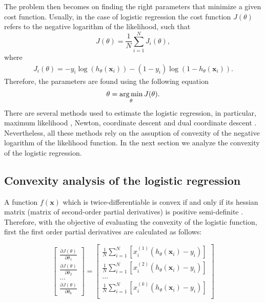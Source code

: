 The problem then becomes on finding the right parameters that minimize a given cost function.   
Usually, in the case of logistic regression the cost function $J(\theta)$ refers to the negative   
logarithm of the likelihood, such that
\begin{equation}
  J(\theta)=\frac{1}{N}\sum_{i=1}^{N} J_i(\theta),
\end{equation}
where
\begin{align}
  J_i(\theta) =  -y_i\log(h_\theta(\mathbf{x}_i)) -(1-y_i)\log(1-h_\theta(\mathbf{x}_i)).
\end{align}
Therefore, the parameters are found using the following equation
\begin{align}
  \theta = \operatorname*{arg\,min}_\theta J(\theta).
\end{align}
There are several methods used to estimate the logistic regression, in particular, maximum 
likelihood \citep{Hastie2009}, Newton, coordinate descent \citep{Murphy2012} and dual coordinate 
descent \citep{Yu2011}. Nevertheless, all these methods rely on the assuption of convexity of the
negative logarithm of the likelihood function. In the next section we analyze the convexity of the 
logistic regression.

\subsection{Convexity analysis of the logistic regression}

A function $f(\mathbf{x})$ which is twice-differentiable is convex if and only if its hessian 
matrix (matrix of second-order partial derivatives) is positive semi-definite \citep{Boyd2010}.
Therefore, with the objective of evaluating the convexity of the logistic function, first the first 
order partial derivatives are calculated as follows:

\begin{equation}
\left[ \begin{array}{c}
  \frac{\partial J(\theta)}{\partial \theta_1} \\[0.1in]	
  \frac{\partial J(\theta)}{\partial \theta_2} \\[0.1in]	
  \ldots \\[0.1in]	
  \frac{\partial J(\theta)}{\partial \theta_k}
\end{array} \right] =
\left[ \begin{array}{c}
  \frac{1}{N}\sum_{i=1}^{N}\left[x_i^{(1)}\left(h_\theta(\mathbf{x}_i)-y_i\right)\right]\\[0.1in]
  \frac{1}{N}\sum_{i=1}^{N}\left[x_i^{(2)}\left(h_\theta(\mathbf{x}_i)-y_i\right)\right]\\[0.1in]
  \ldots \\[0.1in]	
  \frac{1}{N}\sum_{i=1}^{N}\left[x_i^{(k)}\left(h_\theta(\mathbf{x}_i)-y_i\right)\right]\\[0.1in]	
\end{array} \right]
\end{equation}

